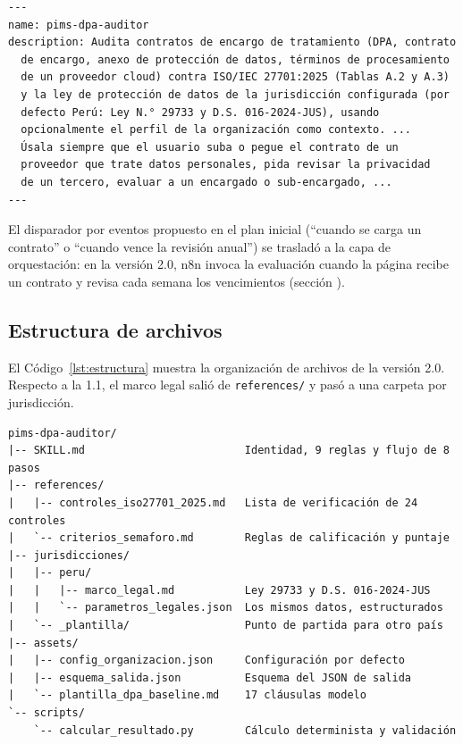 \documentclass[12pt,letterpaper]{article}
\begin{document}
\begin{lstlisting}[style=codigo, caption={Metadatos de activación de la skill, versión 2.0 (extracto)}, label={lst:frontmatter}]
---
name: pims-dpa-auditor
description: Audita contratos de encargo de tratamiento (DPA, contrato
  de encargo, anexo de protección de datos, términos de procesamiento
  de un proveedor cloud) contra ISO/IEC 27701:2025 (Tablas A.2 y A.3)
  y la ley de protección de datos de la jurisdicción configurada (por
  defecto Perú: Ley N.° 29733 y D.S. 016-2024-JUS), usando
  opcionalmente el perfil de la organización como contexto. ...
  Úsala siempre que el usuario suba o pegue el contrato de un
  proveedor que trate datos personales, pida revisar la privacidad
  de un tercero, evaluar a un encargado o sub-encargado, ...
---
\end{lstlisting}

El disparador por eventos propuesto en el plan inicial (``cuando se carga un contrato'' o ``cuando vence la revisión anual'') se trasladó a la capa de orquestación: en la versión 2.0, n8n invoca la evaluación cuando la página recibe un contrato y revisa cada semana los vencimientos (sección ).

\subsection{Estructura de archivos}

El Código~\ref{lst:estructura} muestra la organización de archivos de la versión 2.0. Respecto a la 1.1, el marco legal salió de \texttt{references/} y pasó a una carpeta por jurisdicción.

\begin{lstlisting}[style=codigo, caption={Estructura de la skill versión 2.0}, label={lst:estructura}, numbers=none]
pims-dpa-auditor/
|-- SKILL.md                         Identidad, 9 reglas y flujo de 8 pasos
|-- references/
|   |-- controles_iso27701_2025.md   Lista de verificación de 24 controles
|   `-- criterios_semaforo.md        Reglas de calificación y puntaje
|-- jurisdicciones/
|   |-- peru/
|   |   |-- marco_legal.md           Ley 29733 y D.S. 016-2024-JUS
|   |   `-- parametros_legales.json  Los mismos datos, estructurados
|   `-- _plantilla/                  Punto de partida para otro país
|-- assets/
|   |-- config_organizacion.json     Configuración por defecto
|   |-- esquema_salida.json          Esquema del JSON de salida
|   `-- plantilla_dpa_baseline.md    17 cláusulas modelo
`-- scripts/
    `-- calcular_resultado.py        Cálculo determinista y validación
\end{lstlisting}
\end{document}
